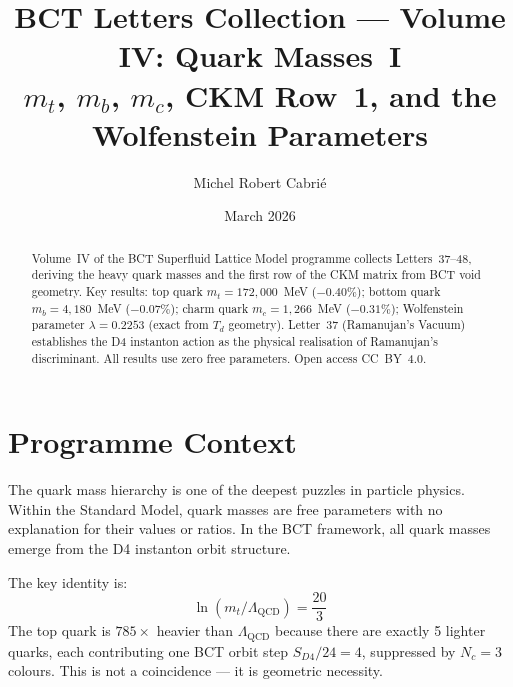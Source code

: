 \documentclass[aps,prl,twocolumn,showpacs,preprintnumbers]{revtex4-2}
\newcommand{\LQCD}{\Lambda_{\mathrm{QCD}}}
\begin{document}

\title{BCT Letters Collection --- Volume IV: Quark Masses~I\\
\large $m_t$, $m_b$, $m_c$, CKM Row~1, and the Wolfenstein Parameters}

\author{Michel Robert Cabri\'e}

\date{March 2026}

\begin{abstract}
Volume~IV of the BCT Superfluid Lattice Model programme collects
Letters~37--48, deriving the heavy quark masses and the first row
of the CKM matrix from BCT void geometry. Key results: top quark
$m_t = 172{,}000$~MeV ($-0.40\%$); bottom quark $m_b = 4{,}180$~MeV
($-0.07\%$); charm quark $m_c = 1{,}266$~MeV ($-0.31\%$); Wolfenstein
parameter $\lambda = 0.2253$ (exact from $T_d$ geometry). Letter~37
(Ramanujan's Vacuum) establishes the D4 instanton action as the
physical realisation of Ramanujan's discriminant. All results use
zero free parameters. Open access CC~BY~4.0.
\end{abstract}

\maketitle

\section*{Programme Context}

The quark mass hierarchy is one of the deepest puzzles in particle
physics. Within the Standard Model, quark masses are free parameters
with no explanation for their values or ratios. In the BCT framework,
all quark masses emerge from the D4 instanton orbit structure.

The key identity is:
\begin{equation}
\ln(m_t/\LQCD) = \frac{20}{3}
\end{equation}
The top quark is $785\times$ heavier than $\LQCD$ because there are
exactly 5 lighter quarks, each contributing one BCT orbit step
$S_{D4}/24 = 4$, suppressed by $N_c = 3$ colours. This is not a
coincidence --- it is geometric necessity.
\end{document}

